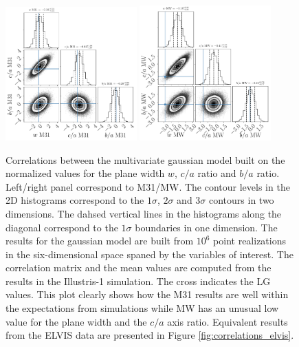 \documentclass[a4paper,fleqn,usenatbib]{mnras}
\begin{document}
\begin{figure}
\centering
\includegraphics[width=0.45\textwidth]{gaussian_model_illustris_M31.pdf}
\includegraphics[width=0.45\textwidth]{gaussian_model_illustris_MW.pdf}
\caption{Correlations between the multivariate gaussian model built on
  the normalized values for the plane width $w$, $c/a$ ratio and $b/a$ ratio. 
Left/right panel correspond to M31/MW. 
The contour levels in the 2D histograms correspond to the $1\sigma$,
$2\sigma$ and $3\sigma$ contours in two dimensions. 
The dahsed vertical lines in the histograms along the diagonal
correspond to the $1\sigma$ boundaries in one dimension.
The results for the gaussian model are built from $10^6$ point
realizations in the six-dimensional space spaned by the variables of
interest. 
The correlation matrix and the mean values are computed from the
results in the Illustris-1 simulation.
The cross indicates the LG values.
This plot clearly shows how the M31 results are well within the
expectations from simulations while MW has an unusual low value for
the plane width and the $c/a$ axis ratio.
Equivalent results from the ELVIS data are presented in Figure
\ref{fig:correlations_elvis}.
\label{fig:correlations_illustris}}
\end{figure}
\end{document}
